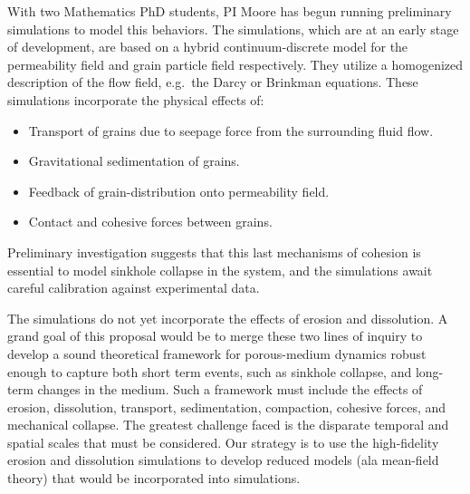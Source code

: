 \documentclass[11pt]{article}
\begin{document}

	With two Mathematics PhD students, PI Moore has begun running preliminary simulations to model this behaviors. The simulations, which are at an early stage of development, are based on a hybrid continuum-discrete model for the permeability field and grain particle field respectively. They utilize a homogenized description of the flow field, e.g.~the Darcy or Brinkman equations.
These simulations incorporate the physical effects of:
\begin{itemize}
\item Transport of grains due to seepage force from the surrounding fluid flow.
\item Gravitational sedimentation of grains.
\item Feedback of grain-distribution onto permeability field.
\item Contact and cohesive forces between grains.
\end{itemize}
Preliminary investigation suggests that this last mechanisms of cohesion is essential to model sinkhole collapse in the system, and the simulations await careful calibration against experimental data.

The simulations do not yet incorporate the effects of erosion and dissolution. A grand goal of this proposal would be to merge these two lines of inquiry to develop a sound theoretical framework for porous-medium dynamics robust enough to capture both short term events, such as sinkhole collapse, and long-term changes in the medium. Such a framework must include the effects of erosion, dissolution, transport, sedimentation, compaction, cohesive forces, and mechanical collapse. The greatest challenge faced is the disparate temporal and spatial scales that must be considered. Our strategy is to use the high-fidelity erosion and dissolution simulations to develop reduced models (ala mean-field theory) that would be incorporated into simulations.



\end{document}
